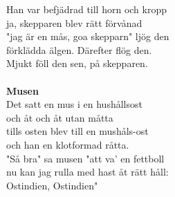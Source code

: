 Han var befjädrad till horn och kropp\\
ja, skepparen blev rätt förvånad\\
"jag är en mås, goa skepparn" ljög den\\
förklädda älgen. Därefter flög den.\\
Mjukt föll den sen, på skepparen.\\
\\
\textbf{Musen}\\
Det satt en mus i en hushållsost\\
och åt och åt utan måtta\\
tills osten blev till en mushåls-ost\\
och han en klotformad råtta.\\
"Så bra" sa musen "att va' en fettboll\\
nu kan jag rulla med hast åt rätt håll:\\
Ostindien, Ostindien"\\

